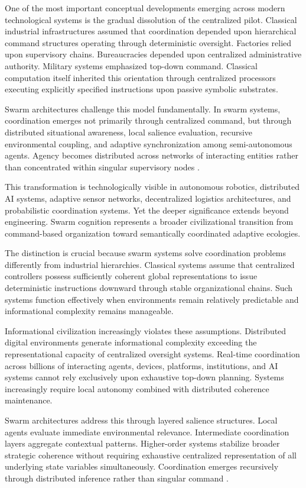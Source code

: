 \documentclass[11pt,a4paper]{article}
\begin{document}
One of the most important conceptual developments emerging across modern technological systems is the gradual dissolution of the centralized pilot. Classical industrial infrastructures assumed that coordination depended upon hierarchical command structures operating through deterministic oversight. Factories relied upon supervisory chains. Bureaucracies depended upon centralized administrative authority. Military systems emphasized top-down command. Classical computation itself inherited this orientation through centralized processors executing explicitly specified instructions upon passive symbolic substrates.

Swarm architectures challenge this model fundamentally. In swarm systems, coordination emerges not primarily through centralized command, but through distributed situational awareness, local salience evaluation, recursive environmental coupling, and adaptive synchronization among semi-autonomous agents. Agency becomes distributed across networks of interacting entities rather than concentrated within singular supervisory nodes \cite{bonabeau1999}.

This transformation is technologically visible in autonomous robotics, distributed AI systems, adaptive sensor networks, decentralized logistics architectures, and probabilistic coordination systems. Yet the deeper significance extends beyond engineering. Swarm cognition represents a broader civilizational transition from command-based organization toward semantically coordinated adaptive ecologies.

The distinction is crucial because swarm systems solve coordination problems differently from industrial hierarchies. Classical systems assume that centralized controllers possess sufficiently coherent global representations to issue deterministic instructions downward through stable organizational chains. Such systems function effectively when environments remain relatively predictable and informational complexity remains manageable.

Informational civilization increasingly violates these assumptions. Distributed digital environments generate informational complexity exceeding the representational capacity of centralized oversight systems. Real-time coordination across billions of interacting agents, devices, platforms, institutions, and AI systems cannot rely exclusively upon exhaustive top-down planning. Systems increasingly require local autonomy combined with distributed coherence maintenance.

Swarm architectures address this through layered salience structures. Local agents evaluate immediate environmental relevance. Intermediate coordination layers aggregate contextual patterns. Higher-order systems stabilize broader strategic coherence without requiring exhaustive centralized representation of all underlying state variables simultaneously. Coordination emerges recursively through distributed inference rather than singular command \cite{bonabeau1999}.
\end{document}
